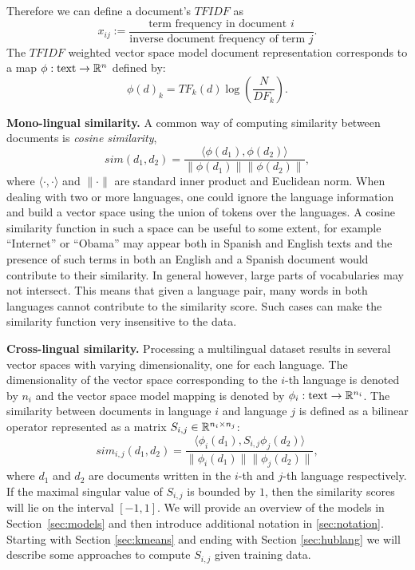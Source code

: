 Therefore we can define a document's $TFIDF$ as
$$ x_{ij}  := \frac{\mbox{term frequency in document } i}{\mbox{inverse document frequency of term } j}.$$
The $TFIDF$ weighted vector space model document representation corresponds 
to a map $\phi : \text{text} \rightarrow \mathbb{R}^n$ defined by: 
$$\phi(d)_k = {TF}_k(d) \log\left( \frac{N}{{DF}_k}\right).$$

\noindent\textbf {Mono-lingual similarity.}
A common way of computing similarity between documents is \emph{cosine similarity},
$$sim(d_1, d_2) = \frac{\langle \phi(d_1), \phi(d_2)\rangle}{\|\phi(d_1)\| \|\phi(d_2)\|},$$
where $\langle \cdot,\cdot \rangle$ and $\|\cdot\|$ are standard inner product and 
Euclidean norm. When dealing with two or more languages, one could ignore the language information
and build a vector space using the union of tokens over the languages. A cosine similarity 
function in such a space can be useful to some extent, for example ``Internet'' or ``Obama'' 
may appear both in Spanish and English texts and the presence of such terms in both an 
English and a Spanish document would contribute to their similarity. In general however, 
large parts of vocabularies may not intersect. This means that given a language pair, 
many words in both languages cannot contribute to the similarity score. Such cases 
can make the similarity function very insensitive to the data.

\noindent\textbf {Cross-lingual similarity.}
Processing a multilingual dataset results in several vector spaces with varying dimensionality, 
one for each language. The dimensionality of the vector space corresponding to the $i$-th 
language is denoted by $n_i$ and the vector space model mapping is denoted by 
$\phi_i : \text{text} \rightarrow \mathbb{R}^{n_i}$.
The similarity between documents in language $i$ and language $j$ is defined as a bilinear 
operator represented as a matrix $S_{i,j} \in \mathbb{R}^{n_i \times n_j}$:
$$sim_{i,j}(d_1, d_2) = \frac{ \langle \phi_i (d_1), S_{i,j} \phi_j (d_2) \rangle }{\|\phi_i(d_1)\| \|\phi_j(d_2)\|},$$
where $d_1$ and $d_2$ are documents written in the $i$-th and $j$-th language respectively. 
If the maximal singular value of $S_{i,j}$ is bounded by $1$, then the similarity scores 
will lie on the interval $[-1, 1]$. We will provide an overview of the models in 
Section~\ref{sec:models} and then introduce additional notation in \ref{sec:notation}. 
Starting with Section \ref{sec:kmeans} and ending with Section \ref{sec:hublang} we will 
describe some approaches to compute $S_{i,j}$ given training data.

